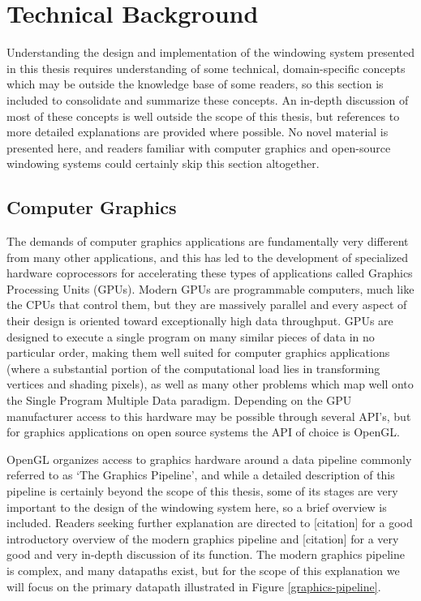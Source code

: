 \chapter{Technical Background}
Understanding the design and implementation of the windowing system presented in this thesis requires understanding of some technical, domain-specific concepts which may be outside the knowledge base of some readers, so this section is included to consolidate and summarize these concepts. An in-depth discussion of most of these concepts is well outside the scope of this thesis, but references to more detailed explanations are provided where possible. No novel material is presented here, and readers familiar with computer graphics and open-source windowing systems could certainly skip this section altogether.

\section{Computer Graphics}
The demands of computer graphics applications are fundamentally very different from many other applications, and this has led to the development of specialized hardware coprocessors for accelerating these types of applications called Graphics Processing Units (GPUs). Modern GPUs are programmable computers, much like the CPUs that control them, but they are massively parallel and every aspect of their design is oriented toward exceptionally high data throughput. GPUs are designed to execute a single program on many similar pieces of data in no particular order, making them well suited for computer graphics applications (where a substantial portion of the computational load lies in transforming vertices and shading pixels), as well as many other problems which map well onto the Single Program Multiple Data paradigm. Depending on the GPU manufacturer access to this hardware may be possible through several API’s, but for graphics applications on open source systems the API of choice is OpenGL.
		
OpenGL organizes access to graphics hardware around a data pipeline commonly referred to as ‘The Graphics Pipeline’, and while a detailed description of this pipeline is certainly beyond the scope of this thesis, some of its stages are very important to the design of the windowing system here, so a brief overview is included. Readers seeking further explanation are directed to [citation] for a good introductory overview of the modern graphics pipeline and [citation] for a very good and very in-depth discussion of its function. The modern graphics pipeline is complex, and many datapaths exist, but for the scope of this explanation we will focus on the primary datapath illustrated in Figure \ref{graphics-pipeline}.

